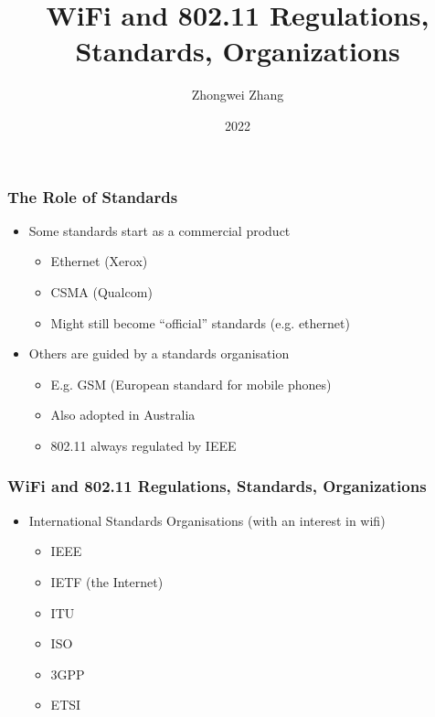 \documentclass[18pt]{beamer}
\title{WiFi and 802.11 Regulations, Standards, Organizations}
\author{Zhongwei Zhang}
\institute{University of Southern Queensland}
\date{2022}
\begin{document}
\frame{\titlepage}
 
\begin{frame}\LARGE
\frametitle{The Role of Standards}
\begin{itemize}\Large
\item Some standards start as a commercial product
\begin{itemize}\large
\item Ethernet (Xerox)
\item CSMA (Qualcom)
\item Might still become ``official'' standards (e.g. ethernet)
\end{itemize}
\item Others are guided by a standards organisation
\begin{itemize}\large
\item E.g. GSM (European standard for mobile phones)
\item Also adopted in Australia
\item 802.11 always regulated by IEEE
\end{itemize}
\end{itemize}
\end{frame}

\begin{frame}\LARGE
\frametitle{WiFi and 802.11 Regulations, Standards, Organizations}
\begin{itemize}\Large
\item International Standards Organisations (with an interest in wifi)
\begin{itemize}\large
\item IEEE
\item IETF (the Internet)
\item ITU
\item ISO
\item 3GPP
\item ETSI
\end{itemize}
\end{itemize}
\end{frame}
\end{document}
